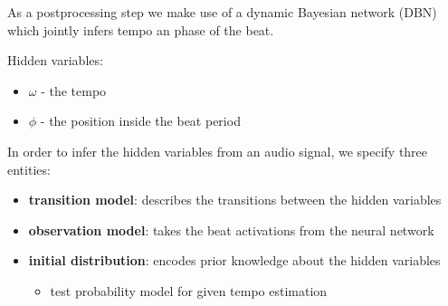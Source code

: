\documentclass{article}
\begin{document}
As a postprocessing step we make use of a dynamic Bayesian network (DBN) which jointly infers tempo an phase of the beat.

\vspace{1em}
Hidden variables: 
\begin{itemize}
\item $\omega$ - the tempo
\item $\phi$ - the position inside the beat period
\end{itemize}

\vspace{1em}
In order to infer the hidden variables from an audio signal, we specify three entities:

\begin{itemize}
\item \textbf{transition model}: describes the transitions between the hidden variables 
\item \textbf{observation model}: takes the beat activations from the neural network
\item \textbf{initial distribution}: encodes prior knowledge about the hidden variables
\begin{itemize}
\item test probability model for given tempo estimation 
\end{itemize}
\end{itemize}
\end{document}
